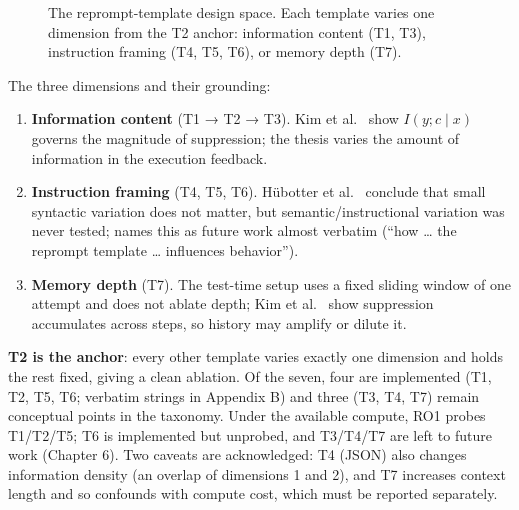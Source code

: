 \begin{figure}[H]
\centering
{}
\caption{The reprompt-template design space. Each template varies one dimension from the T2 anchor: information content (T1, T3), instruction framing (T4, T5, T6), or memory depth (T7).}
\label{fig:template-space}
\end{figure}

The three dimensions and their grounding:

\begin{enumerate}
\def\labelenumi{\arabic{enumi}.}
\tightlist
\item
  \textbf{Information content} (T1 → T2 → T3). Kim et al.~\cite{r2} show \(I(y; c \mid x)\) governs the magnitude of suppression; the thesis varies the amount of information in the execution feedback.
\item
  \textbf{Instruction framing} (T4, T5, T6). Hübotter et al.~\cite{r1} conclude that small syntactic variation does not matter, but semantic/instructional variation was never tested; \cite{r1} names this as future work almost verbatim (``how \ldots{} the reprompt template \ldots{} influences behavior'').
\item
  \textbf{Memory depth} (T7). The test-time setup \cite{r1} uses a fixed sliding window of one attempt and does not ablate depth; Kim et al.~\cite{r2} show suppression accumulates across steps, so history may amplify or dilute it.
\end{enumerate}

\textbf{T2 is the anchor}: every other template varies exactly one dimension and holds the rest fixed, giving a clean ablation. Of the seven, four are implemented (T1, T2, T5, T6; verbatim strings in Appendix B) and three (T3, T4, T7) remain conceptual points in the taxonomy. Under the available compute, RO1 probes T1/T2/T5; T6 is implemented but unprobed, and T3/T4/T7 are left to future work (Chapter 6). Two caveats are acknowledged: T4 (JSON) also changes information density (an overlap of dimensions 1 and 2), and T7 increases context length and so confounds with compute cost, which must be reported separately.

